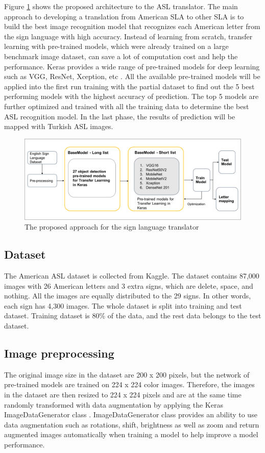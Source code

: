 Figure \ref{fig:the proposed approach} shows the proposed architecture to the ASL translator. The main approach to developing a translation from American SLA to other SLA is to build the best image recognition model that recognizes each American letter from the sign language with high accuracy. Instead of learning from scratch, transfer learning with pre-trained models, which were already trained on a large benchmark image dataset, can save a lot of computation cost and help the performance. Keras provides a wide range of pre-trained models for deep learning such as VGG, ResNet, Xception, etc \cite{keras}. All the available pre-trained models will be applied into the first run training with the partial dataset to find out the 5 best performing models with the highest accuracy of prediction. The top 5 models are further optimized and trained with all the training data to determine the best ASL recognition model. In the last phase, the results of prediction will be mapped with Turkish ASL images.

\begin{figure}[h]
    \centering
    \caption{The proposed approach for the sign language translator}
	\label{fig:the proposed approach}
    \includegraphics[width=\linewidth]{figures/The approach}
\end{figure}


\subsection{Dataset}
The American ASL dataset is collected from Kaggle. The dataset contains 87,000 images with 26 American letters and 3 extra signs, which are delete, space, and nothing. All the images are equally distributed to the 29 signs. In other words, each sign has 4,300 images. The whole dataset is split into training and test dataset. Training dataset is 80\% of the data, and the rest data belongs to the test dataset. 


\subsection{Image preprocessing}
The original image size in the dataset are 200 x 200 pixels, but the network of pre-trained models are trained on 224 x 224 color images. Therefore, the images in the dataset are then resized to 224 x 224 pixels and are at the same time randomly transformed with data augmentation by applying the Keras ImageDataGenerator class \cite{keras}. ImageDataGenerator class provides an ability to use data augmentation such as rotations, shift, brightness as well as zoom and return augmented images automatically when training a model to help improve a model performance.

